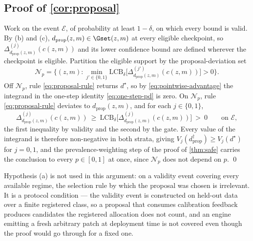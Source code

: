 \subsection{Proof of \texorpdfstring{\cref{cor:proposal}}{the proposal corollary}}

Work on the event $\mathcal E$, of probability at least $1-\delta$, on which
every bound is valid.  By (b) and (c), $d_{\mathrm{prop}}(z,m)\in\Gset(z,m)$ at
every eligible checkpoint, so $\Delta^{(j)}_{d_{\mathrm{prop}}(z,m)}(c(z,m))$ and
its lower confidence bound are defined wherever the checkpoint is eligible.
Partition the eligible support by the proposal-deviation set
\begin{equation}
 \mathcal N_p=\Big\{(z,m):\min_{j'\in\{0,1\}}\mathrm{LCB}_\delta
 \big[\Delta^{(j')}_{d_{\mathrm{prop}}(z,m)}(c(z,m))\big]>0\Big\}.
\end{equation}
Off $\mathcal N_p$, rule \eqref{eq:proposal-rule} returns $d^\star$, so by
\eqref{eq:pointwise-advantage} the integrand in the one-step identity
\eqref{eq:one-step-pd} is zero.  On $\mathcal N_p$, rule \eqref{eq:proposal-rule}
deviates to $d_{\mathrm{prop}}(z,m)$, and for each $j\in\{0,1\}$,
\begin{equation}
 \Delta^{(j)}_{d_{\mathrm{prop}}(z,m)}(c(z,m))\ \ge\
 \mathrm{LCB}_\delta\big[\Delta^{(j)}_{d_{\mathrm{prop}}(z,m)}(c(z,m))\big]\ >\ 0
 \qquad\text{on }\mathcal E,
\end{equation}
the first inequality by validity and the second by the gate.  Every value of the
integrand is therefore non-negative in both strata, giving
$V_j(d^{\dagger}_{\mathrm{prop}})\ge V_j(d^\star)$ for $j=0,1$, and the 
prevalence-weighting step of the proof of \cref{thm:safe} carries the conclusion
to every $p\in[0,1]$ at once, since $\mathcal N_p$ does not depend on $p$. \qed

\medskip
Hypothesis (a) is not used in this argument: on a validity event covering every
available regime, the selection rule by which the proposal was chosen is
irrelevant.  It is a protocol condition --- the validity event is constructed on
held-out data over a finite registered class, so a proposal that consumes
calibration feedback produces candidates the registered allocation does not
count, and an engine emitting a fresh arbitrary patch at deployment time is not
covered even though the proof would go through for a fixed one.

